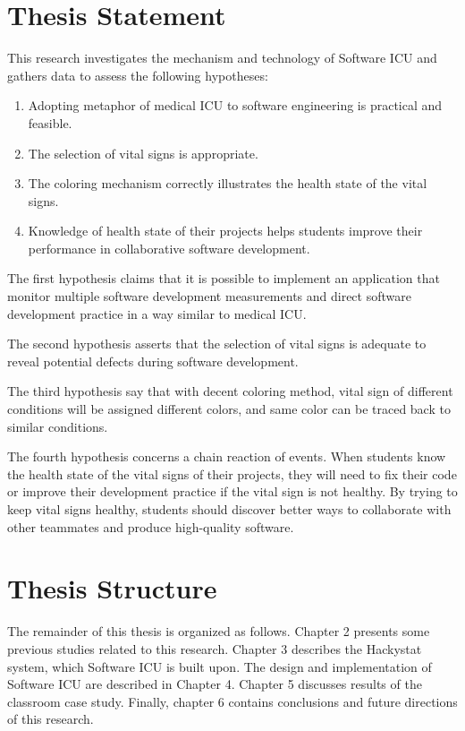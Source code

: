\section{Thesis Statement}
This research investigates the mechanism and technology of Software ICU and gathers data to assess the following hypotheses: 
\begin{enumerate}
\item Adopting metaphor of medical ICU to software engineering is practical and feasible.
\item The selection of vital signs is appropriate.
\item The coloring mechanism correctly illustrates the health state of the vital signs.
\item Knowledge of health state of their projects helps students improve their performance in collaborative software development.
\end{enumerate}
The first hypothesis claims that it is possible to implement an application that monitor multiple software development measurements and direct software development practice in a way similar to medical ICU.

The second hypothesis asserts that the selection of vital signs is adequate to reveal potential defects during software development.

The third hypothesis say that with decent coloring method, vital sign of different conditions will be assigned different colors, and same color can be traced back to similar conditions.

The fourth hypothesis concerns a chain reaction of events. When students know the health state of the vital signs of their projects, they will need to fix their code or improve their development practice if the vital sign is not healthy. By trying to keep vital signs healthy, students should discover better ways to collaborate with other teammates and produce high-quality software.

\section{Thesis Structure}
The remainder of this thesis is organized as follows. Chapter 2 presents some previous studies related to this research. Chapter 3 describes the Hackystat system, which Software ICU is built upon. The design and implementation of Software ICU are described in Chapter 4. Chapter 5 discusses results of the classroom case study. Finally, chapter 6 contains conclusions and future directions of this research. 

